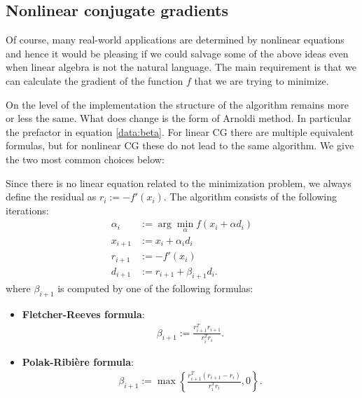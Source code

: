 {\subsection{Nonlinear conjugate gradients}

    Of course, many real-world applications are determined by nonlinear equations and hence it would be pleasing if we could salvage some of the above ideas even when linear algebra is not the natural language. The main requirement is that we can calculate the gradient of the function $f$ that we are trying to minimize.

    On the level of the implementation the structure of the algorithm remains more or less the same. What does change is the form of Arnoldi method. In particular the prefactor in equation \ref{data:beta}. For linear CG there are multiple equivalent formulas, but for nonlinear CG these do not lead to the same algorithm. We give the two most common choices below:
    \begin{method}[Nonlinear CG]
        Since there is no linear equation related to the minimization problem, we always define the residual as $r_i:=-f'(x_i)$. The algorithm consists of the following iterations:
        \begin{align}
            \alpha_i &:= \arg\min_\alpha f(x_i+\alpha d_i)\label{data:argmin}\\
            x_{i+1} &:= x_i+\alpha_id_i\\
            r_{i+1} &:= -f'(x_i)\\
            d_{i+1} &:= r_{i+1}+\beta_{i+1}d_i.
        \end{align}
        where $\beta_{i+1}$ is computed by one of the following formulas:
        \begin{itemize}
            \item \textbf{Fletcher-Reeves formula}:
                \begin{gather}
                    \beta_{i+1} := \frac{r_{i+1}^Tr_{i+1}}{r_i^Tr_i}.
                \end{gather}
            \item \textbf{Polak-Ribi\`ere formula}:
                \begin{gather}
                    \label{data:polak_ribiere}
                    \beta_{i+1} := \max\left\{\frac{r_{i+1}^T(r_{i+1}-r_i)}{r_i^Tr_i}, 0\right\}.
                \end{gather}
        \end{itemize}
    \end{method}

}
